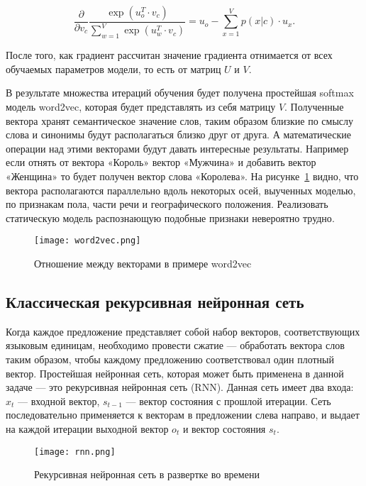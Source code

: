 \begin{equation}
  \frac{\partial }{\partial v_c}\frac{\exp({u_{o}^T}\cdot{v_{c}})}{\sum_{w=1}^{V}\exp({u_w^T}\cdot{v_{c}})} = u_o - \sum_{x=1}^{V}p(x|c)\cdot{u_x}.
\end{equation}

После того, как градиент рассчитан значение градиента отнимается от всех обучаемых параметров модели, то есть от матриц $U$ и $V$.

В результате множества итераций обучения будет получена простейшая softmax модель word2vec, которая будет представлять из себя матрицу $V$. Полученные вектора хранят семантическое значение слов, таким образом близкие по смыслу слова и синонимы будут располагаться близко друг от друга. А математические операции над этими векторами будут давать интересные результаты. Например если отнять от вектора «Король» вектор «Мужчина» и добавить вектор «Женщина» то будет получен вектор слова «Королева». На рисунке~\ref{fig:overview:word2vec} видно, что вектора располагаются параллельно вдоль некоторых осей, выученных моделью, по признакам пола, части речи и географического положения. Реализовать статическую модель распознающую подобные признаки невероятно трудно\cite{word2vec}.

\begin{figure}[h]
  \begin{center}
    \texttt{[image: word2vec.png]}
    \caption{Отношение между векторами в примере word2vec\cite{word2vec}}\label{fig:overview:word2vec}
  \end{center}
\end{figure}

\subsection{Классическая рекурсивная нейронная сеть}\label{subsec:overview:rnn}
Когда каждое предложение представляет собой набор векторов, соответствующих языковым единицам, необходимо провести сжатие --- обработать вектора слов таким образом, чтобы каждому предложению соответствовал один плотный вектор. Простейшая нейронная сеть, которая может быть применена в данной задаче --- это рекурсивная нейронная сеть (RNN). Данная сеть имеет два входа: $x_{t}$ --- входной вектор, $s_{t-1}$ --- вектор состояния с прошлой итерации. Сеть последовательно применяется к векторам в предложении слева направо, и выдает на каждой итерации выходной вектор $o_{t}$ и вектор состояния $s_t$.

\begin{figure}[h]
  \begin{center}
    \texttt{[image: rnn.png]}
    \caption{Рекурсивная нейронная сеть в развертке во времени\cite{Goodfellow-et-al-2016}}\label{fig:overview:rnn}
  \end{center}
\end{figure}

